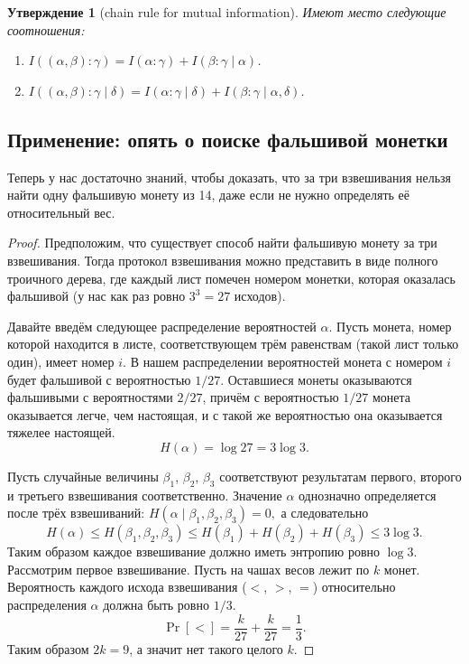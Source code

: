 \documentclass[12pt]{article}
\theoremstyle{definition}
\theoremstyle{plain}
\newtheorem{statement}{Утверждение}[section]
\theoremstyle{remark}
\begin{document}
\begin{statement}[chain rule for mutual information]
    Имеют место следующие соотношения:
    \begin{enumerate}
        \item $I((\alpha,\beta) : \gamma) = I(\alpha : \gamma) + I(\beta: \gamma \mid \alpha)$.
        \item $I((\alpha,\beta) : \gamma \mid \delta) = I(\alpha : \gamma\mid \delta) + I(\beta: \gamma \mid \alpha,\delta)$.
    \end{enumerate}
\end{statement}

\subsection{Применение: опять о поиске фальшивой монетки}
Теперь у нас достаточно знаний, чтобы доказать, что за три взвешивания нельзя
найти одну фальшивую монету из 14, даже если не нужно определять её
относительный вес.
\begin{proof}
    Предположим, что существует способ найти фальшивую монету за три
    взвешивания. Тогда протокол взвешивания можно представить в виде полного
    троичного дерева, где каждый лист помечен номером монетки, которая оказалась
    фальшивой (у нас как раз ровно \(3^3=27\) исходов). 

    Давайте введём следующее распределение вероятностей \(\alpha\). 
    Пусть монета, номер которой находится в листе, соответствующем трём равенствам
    (такой лист только один), имеет номер \(i\). В нашем распределении
    вероятностей монета с номером \(i\) будет фальшивой с вероятностью \(1/27\).
    Оставшиеся монеты оказываются фальшивыми с вероятностями \(2/27\), причём
    с вероятностью \(1/27\) монета оказывается легче, чем настоящая, и с
    такой же вероятностью она оказывается тяжелее настоящей.
    \[
        H(\alpha) = \log 27 = 3\log 3.
    \]

    Пусть случайные величины \(\beta_1\), \(\beta_2\), \(\beta_3\) соответствуют
    результатам первого, второго и третьего взвешивания соответственно.
    Значение $\alpha$ однозначно определяется после трёх взвешиваний:
    \(
        H(\alpha\mid\beta_1,\beta_2,\beta_3) = 0,
    \)
    а следовательно
    \[
        H(\alpha) \le H(\beta_1,\beta_2,\beta_3) \le H(\beta_1) + H(\beta_2) +
        H(\beta_3) \le 3\log3.    
    \]
    Таким образом каждое взвешивание должно иметь энтропию ровно $\log3$.
    Рассмотрим первое взвешивание. Пусть на чашах весов лежит по $k$ монет.
    Вероятность каждого исхода взвешивания ($<$, $>$, $=$) относительно
    распределения $\alpha$ должна быть ровно $1/3$.
    \[
        \Pr[<] = \frac{k}{27} + \frac{k}{27} = \frac13.
    \]
    Таким образом $2k = 9$, а значит нет такого целого $k$.
\end{proof}
\end{document}

